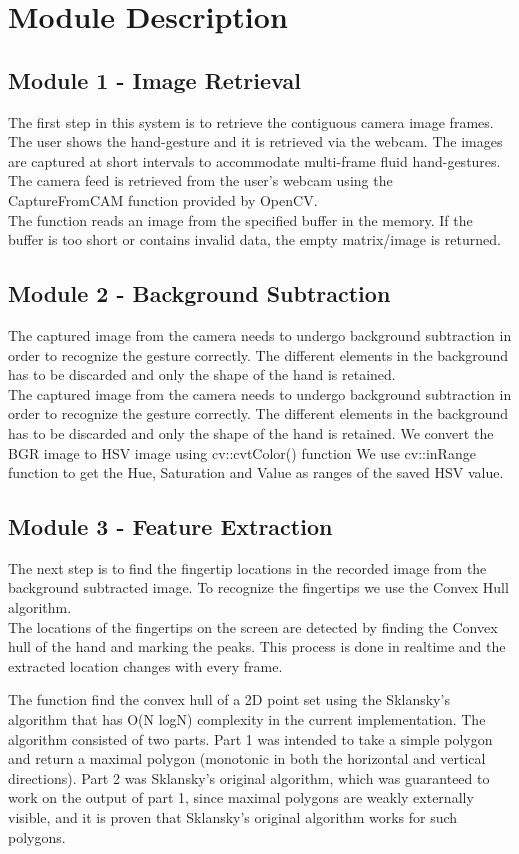 \documentclass[11pt]{report}
\begin{document}
\section{Module Description}

\subsection{Module 1 - Image Retrieval}
The first step in this system is to retrieve the contiguous camera image frames. The user shows the hand-gesture 
and it is retrieved via the webcam. The images are captured at short intervals to accommodate multi-frame fluid hand-gestures.
\\
The camera feed is retrieved from the user's webcam using the CaptureFromCAM function provided by OpenCV.
\\
The function reads an image from the specified buffer in the memory. If the buffer is too short or contains invalid data, the empty matrix/image is returned.
\subsection{Module 2 - Background Subtraction}
The captured image from the camera needs to undergo background subtraction in order to recognize the gesture correctly. 
The different elements in the background has to be discarded and only the shape of the hand is retained. 
\\
The captured image from the camera needs to undergo background subtraction in order to recognize the gesture correctly. The different elements in the background has to be discarded and only the shape of the hand is retained.  
We convert the BGR image to HSV image using cv::cvtColor() function
We use cv::inRange function to get the Hue, Saturation and Value as ranges of the saved HSV value.
\subsection{Module 3 - Feature Extraction}
The next step is to find the fingertip locations in the recorded image from the background subtracted image.
To recognize the fingertips we use the Convex Hull algorithm. 
\\
The locations of the fingertips on the screen are detected by finding the Convex hull of the 
hand and marking the peaks. This process is done in realtime and the extracted location changes
 with every frame. 
 
 The function find the convex hull of a 2D point set using the Sklansky’s algorithm
 that has O(N logN) complexity in the current implementation. The algorithm consisted of two parts. 
 Part 1 was intended to take a simple polygon and return a maximal polygon (monotonic in both the 
 horizontal and vertical directions). Part 2 was Sklansky's original algorithm, which
 was guaranteed to work on the output of part 1, since maximal polygons are weakly externally visible,
 and it is proven that Sklansky's original algorithm works for such polygons.
\end{document}
